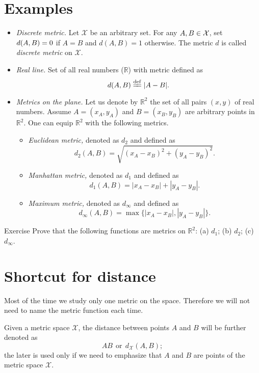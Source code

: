 \section*{Examples}

\begin{itemize}
\item {}\emph{Discrete metric.} Let $\mathcal X$ be an arbitrary set. 
For any $A,B\z\in\mathcal X$, 
set $d(A,B)\z=0$ if $A=B$ and $d(A,B)=1$ otherwise.
The metric $d$ is called \emph{discrete metric} on $\mathcal X$.
\item{}\emph{Real line.} Set of all real numbers ($\mathbb{R}$) with metric defined as 
$$d(A,B)\df|A-B|.$$
\item {}\emph{Metrics on the plane.}
Let us denote by $\mathbb{R}^2$ the set of all pairs $(x,y)$ of real numbers.
Assume $A=(x_A,y_A)$ and $B=(x_B,y_B)$ are arbitrary points in $\mathbb{R}^2$.
One can equip $\mathbb{R}^2$ with the following metrics.
\begin{itemize}
\item{}\emph{Euclidean metric,} denoted as $d_2$ and defined as \label{def:d_2}
$$d_2(A,B)=\sqrt{(x_A-x_B)^2+(y_A-y_B)^2}.$$
\item{}\emph{Manhattan metric,} denoted as $d_1$ and defined as 
$$d_1(A,B)=|x_A-x_B|+|y_A-y_B|.$$
\item{}\emph{Maximum metric,} denoted as $d_\infty$ and defined as 
$$d_\infty(A,B)=\max\{|x_A-x_B|,|y_A-y_B|\}.$$
\end{itemize}
\end{itemize}

\begin{thm}{Exercise}\label{ex:d_1+d_2+d_infty}
Prove that the following functions are metrics on $\mathbb{R}^2$:
(a) $d_1$; (b) $d_2$; (c) $d_\infty$.
\end{thm}


\section*{Shortcut for distance}

Most of the time  
we study only one metric on the space.
Therefore we will not need to name the metric function each time.

Given a metric space $\mathcal X$,
the distance between points $A$ and $B$ will be further denoted as $$AB\ \ \text{or}\ \ d_{\mathcal X}(A,B);$$
the later is used only if we need to emphasize that $A$ and $B$ are points of the metric space $\mathcal X$.


